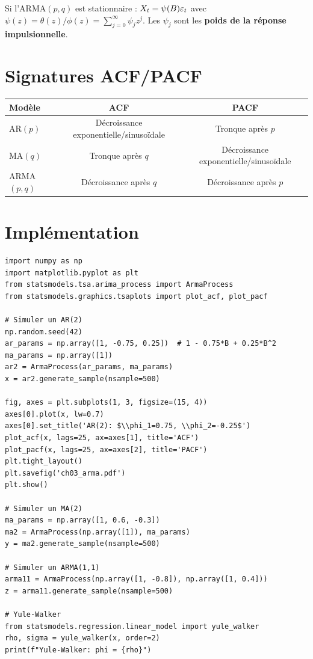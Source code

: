 \begin{theoreme}
Si l'ARMA$(p,q)$ est stationnaire : $X_t = \psi(B)\varepsilon_t$ avec $\psi(z)=\theta(z)/\phi(z)=\sum_{j=0}^{\infty}\psi_j z^j$. Les $\psi_j$ sont les \textbf{poids de la r\'eponse impulsionnelle}.
\end{theoreme}

\section{Signatures ACF/PACF}

\begin{center}
\begin{tabular}{lcc}
\toprule
\textbf{Mod\`ele} & \textbf{ACF} & \textbf{PACF} \\
\midrule
AR$(p)$ & D\'ecroissance exponentielle/sinuso\"idale & Tronque apr\`es $p$ \\
MA$(q)$ & Tronque apr\`es $q$ & D\'ecroissance exponentielle/sinuso\"idale \\
ARMA$(p,q)$ & D\'ecroissance apr\`es $q$ & D\'ecroissance apr\`es $p$ \\
\bottomrule
\end{tabular}
\end{center}

\section{Impl\'ementation}

\begin{codeblock}[title=\textbf{Python}]
\begin{verbatim}
import numpy as np
import matplotlib.pyplot as plt
from statsmodels.tsa.arima_process import ArmaProcess
from statsmodels.graphics.tsaplots import plot_acf, plot_pacf

# Simuler un AR(2)
np.random.seed(42)
ar_params = np.array([1, -0.75, 0.25])  # 1 - 0.75*B + 0.25*B^2
ma_params = np.array([1])
ar2 = ArmaProcess(ar_params, ma_params)
x = ar2.generate_sample(nsample=500)

fig, axes = plt.subplots(1, 3, figsize=(15, 4))
axes[0].plot(x, lw=0.7)
axes[0].set_title('AR(2): $\\phi_1=0.75, \\phi_2=-0.25$')
plot_acf(x, lags=25, ax=axes[1], title='ACF')
plot_pacf(x, lags=25, ax=axes[2], title='PACF')
plt.tight_layout()
plt.savefig('ch03_arma.pdf')
plt.show()

# Simuler un MA(2)
ma_params = np.array([1, 0.6, -0.3])
ma2 = ArmaProcess(np.array([1]), ma_params)
y = ma2.generate_sample(nsample=500)

# Simuler un ARMA(1,1)
arma11 = ArmaProcess(np.array([1, -0.8]), np.array([1, 0.4]))
z = arma11.generate_sample(nsample=500)

# Yule-Walker
from statsmodels.regression.linear_model import yule_walker
rho, sigma = yule_walker(x, order=2)
print(f"Yule-Walker: phi = {rho}")
\end{verbatim}
\end{codeblock}


